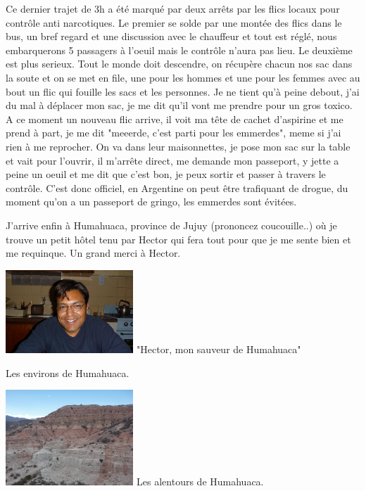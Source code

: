 \begin{multicols}{2}
Ce dernier trajet de 3h a été marqué par deux arrêts par les flics locaux pour contrôle anti narcotiques. Le premier se solde par une montée des flics dans le bus, un bref regard et une discussion avec le chauffeur et tout est réglé, nous embarquerons 5 passagers à l'oeuil mais le contrôle n'aura pas lieu. Le deuxième est plus serieux. Tout le monde doit descendre, on récupère chacun nos sac dans la soute et on se met en file, une pour les hommes et une pour les femmes avec au bout un flic qui fouille les sacs et les personnes. Je ne tient qu'à peine debout, j'ai du mal à déplacer mon sac, je me dit qu'il vont me prendre pour un gros toxico. A ce moment un nouveau flic arrive, il voit ma tête de cachet d'aspirine et me prend à part, je me dit "meeerde, c'est parti pour les emmerdes", meme si j'ai rien à me reprocher. On va dans leur maisonnettes, je pose mon sac sur la table et vait pour l'ouvrir, il m'arrête direct, me demande mon passeport, y jette a peine un oeuil et me dit que c'est bon, je peux sortir et passer à travers le contrôle. C'est donc officiel, en Argentine on peut être trafiquant de drogue, du moment qu'on a un passeport de gringo, les emmerdes sont évitées.

J'arrive enfin à Humahuaca, province de Jujuy (prononcez coucouille..) où je trouve un petit hôtel tenu par Hector qui fera tout pour que je me sente bien et me requinque. Un grand merci à Hector.

\hspace*{-0.65cm}
\includegraphics[width=4.8cm]{articles/La-paz-humahuaca-et-salaar/1257388208hISG.jpg}
"Hector, mon sauveur de Humahuaca"

Les environs de Humahuaca.

\hspace*{-0.65cm}
\includegraphics[width=4.8cm]{articles/La-paz-humahuaca-et-salaar/125738819811hb.jpg}
Les alentours de Humahuaca.


\end{multicols}
